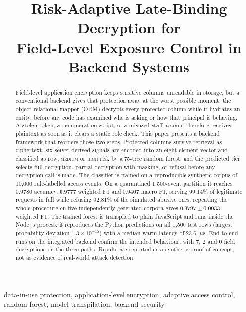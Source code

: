 \documentclass[a4paper,conference]{IEEEtran}
\newcommand{\HIGH}{\textsc{high}}
\newcommand{\MED}{\textsc{medium}}
\newcommand{\LOW}{\textsc{low}}
\begin{document}
\title{Risk-Adaptive Late-Binding Decryption for\\ Field-Level Exposure Control in Backend Systems}

\author{
}

\maketitle

\begin{abstract}
Field-level application encryption keeps sensitive columns unreadable in storage, but a
conventional backend gives that protection away at the worst possible moment: the
object-relational mapper (ORM) decrypts every protected column while it hydrates an entity,
before any code has examined who is asking or how that principal is behaving. A stolen token,
an enumeration script, or a misused staff account therefore receives plaintext as soon as it
clears a static role check. This paper presents a backend framework that reorders those two
steps. Protected columns survive retrieval as ciphertext, six server-derived signals are
encoded into an eight-element vector and classified as \LOW{}, \MED{} or \HIGH{} risk by a
75-tree random forest, and the predicted tier selects full decryption, partial decryption with
masking, or refusal before any decryption call is made. The classifier is trained on a
reproducible synthetic corpus of 10{,}000 rule-labelled access events. On a quarantined
1{,}500-event partition it reaches 0.9780 accuracy, 0.9777 weighted F1 and 0.9407 macro F1,
serving 99.14\% of legitimate requests in full while refusing 92.81\% of the simulated abusive
ones; repeating the whole procedure on five independently generated corpora gives
$0.9797 \pm 0.0033$ weighted F1. The trained forest is transpiled to plain JavaScript and runs
inside the Node.js process: it reproduces the Python predictions on all 1{,}500 test rows
(largest probability deviation $1.3\times10^{-15}$) with a median warm latency of 23.6~$\mu$s.
End-to-end runs on the integrated backend confirm the intended behaviour, with 7, 2 and 0
field decryptions on the three paths. Results are reported as a synthetic proof of concept, not
as evidence of real-world attack detection.
\end{abstract}

\begin{IEEEkeywords}
data-in-use protection, application-level encryption, adaptive access control, random forest,
model transpilation, backend security
\end{IEEEkeywords}
\end{document}

